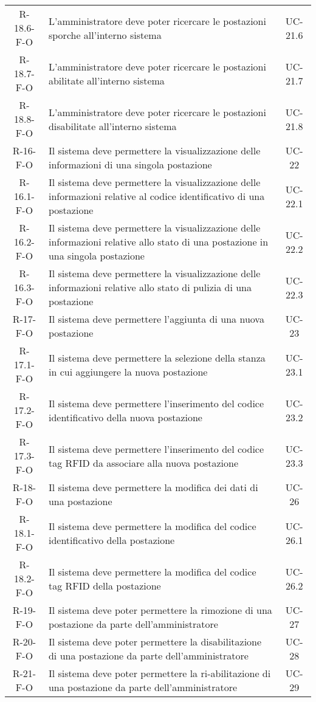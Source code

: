 \begin{longtable}{ c C{9.5cm} c }
    R-18.6-F-O & L'amministratore deve poter ricercare le postazioni sporche all'interno sistema& UC- 21.6\\
    R-18.7-F-O & L'amministratore deve poter ricercare le postazioni abilitate all'interno sistema& UC- 21.7\\
    R-18.8-F-O & L'amministratore deve poter ricercare le postazioni disabilitate all'interno sistema& UC- 21.8\\
    R-16-F-O & Il sistema deve permettere la visualizzazione delle informazioni di una singola postazione& UC- 22\\
    R-16.1-F-O & Il sistema deve permettere la visualizzazione delle informazioni relative al codice identificativo di una postazione & UC- 22.1\\
    R-16.2-F-O & Il sistema deve permettere la visualizzazione delle informazioni relative allo stato di una postazione in una singola postazione& UC- 22.2\\
    R-16.3-F-O & Il sistema deve permettere la visualizzazione delle informazioni relative allo stato di pulizia di una postazione & UC- 22.3\\
    R-17-F-O & Il sistema deve permettere l'aggiunta di una nuova postazione& UC- 23\\
    R-17.1-F-O & Il sistema deve permettere la selezione della stanza in cui aggiungere la nuova postazione& UC- 23.1\\
    R-17.2-F-O & Il sistema deve permettere l'inserimento del codice identificativo della nuova postazione& UC- 23.2\\
    R-17.3-F-O & Il sistema deve permettere l'inserimento del codice tag RFID da associare alla nuova postazione& UC- 23.3\\
    R-18-F-O & Il sistema deve permettere la modifica dei dati di una postazione& UC- 26\\
    R-18.1-F-O & Il sistema deve permettere la modifica del codice identificativo della postazione& UC- 26.1\\
    R-18.2-F-O & Il sistema deve permettere la modifica del codice tag RFID della postazione& UC- 26.2\\
    R-19-F-O &  Il sistema deve poter permettere la rimozione di una postazione da parte dell'amministratore& UC- 27\\
    R-20-F-O &  Il sistema deve poter permettere la disabilitazione di una postazione da parte dell'amministratore& UC- 28\\
    R-21-F-O &  Il sistema deve poter permettere la ri-abilitazione di una postazione da parte dell'amministratore& UC- 29\\

\end{longtable}
